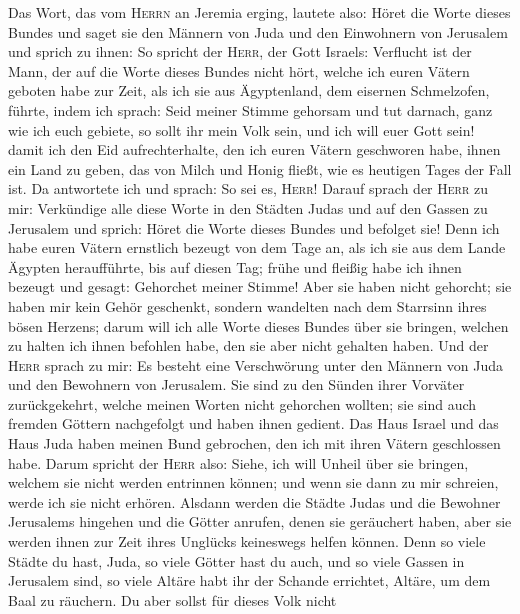 Das Wort, das vom \textsc{Herrn} an Jeremia erging,
lautete also:  Höret die Worte dieses Bundes und saget sie
den Männern von Juda und den Einwohnern von Jerusalem und sprich zu
ihnen:  So spricht der \textsc{Herr}, der Gott Israels:
Verflucht ist der Mann, der auf die Worte dieses Bundes nicht hört,
 welche ich euren Vätern geboten habe zur Zeit, als ich
sie aus Ägyptenland, dem eisernen Schmelzofen, führte, indem ich sprach:
Seid meiner Stimme gehorsam und tut darnach, ganz wie ich euch gebiete,
so sollt ihr mein Volk sein, und ich will euer Gott sein! 
damit ich den Eid aufrechterhalte, den ich euren Vätern geschworen habe,
ihnen ein Land zu geben, das von Milch und Honig fließt, wie es heutigen
Tages der Fall ist. Da antwortete ich und sprach: So sei es,
\textsc{Herr}!  Darauf sprach der \textsc{Herr} zu mir:
Verkündige alle diese Worte in den Städten Judas und auf den Gassen zu
Jerusalem und sprich: Höret die Worte dieses Bundes und befolget sie!
 Denn ich habe euren Vätern ernstlich bezeugt von dem Tage
an, als ich sie aus dem Lande Ägypten heraufführte, bis auf diesen Tag;
frühe und fleißig habe ich ihnen bezeugt und gesagt: Gehorchet meiner
Stimme!  Aber sie haben nicht gehorcht; sie haben mir kein
Gehör geschenkt, sondern wandelten nach dem Starrsinn ihres bösen
Herzens; darum will ich alle Worte dieses Bundes über sie bringen,
welchen zu halten ich ihnen befohlen habe, den sie aber nicht gehalten
haben.  Und der \textsc{Herr} sprach zu mir: Es besteht
eine Verschwörung unter den Männern von Juda und den Bewohnern von
Jerusalem.  Sie sind zu den Sünden ihrer Vorväter
zurückgekehrt, welche meinen Worten nicht gehorchen wollten; sie sind
auch fremden Göttern nachgefolgt und haben ihnen gedient. Das Haus
Israel und das Haus Juda haben meinen Bund gebrochen, den ich mit ihren
Vätern geschlossen habe.  Darum spricht der \textsc{Herr}
also: Siehe, ich will Unheil über sie bringen, welchem sie nicht werden
entrinnen können; und wenn sie dann zu mir schreien, werde ich sie nicht
erhören.  Alsdann werden die Städte Judas und die
Bewohner Jerusalems hingehen und die Götter anrufen, denen sie
geräuchert haben, aber sie werden ihnen zur Zeit ihres Unglücks
keineswegs helfen können.  Denn so viele Städte du hast,
Juda, so viele Götter hast du auch, und so viele Gassen in Jerusalem
sind, so viele Altäre habt ihr der Schande errichtet, Altäre, um dem
Baal zu räuchern.  Du aber sollst für dieses Volk nicht
